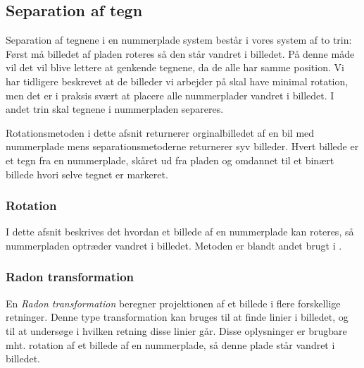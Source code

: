 \subsection{Separation af tegn}

Separation af tegnene i en nummerplade system består i vores system af to trin: Først må billedet af pladen roteres så den står vandret i billedet. På denne måde vil det vil blive lettere at genkende tegnene, da de alle har samme position. Vi har tidligere beskrevet at de billeder vi arbejder på skal have minimal rotation, men det er i praksis svært at placere alle nummerplader vandret i billedet. I andet trin skal tegnene i nummerpladen separeres.


Rotationsmetoden i dette afsnit returnerer orginalbilledet af en bil med nummerplade mens separationsmetoderne returnerer syv billeder. Hvert billede er et tegn fra en nummerplade, skåret ud fra pladen og omdannet til et binært billede hvori selve tegnet er markeret.


\subsubsection{Rotation}

I dette afsnit beskrives det hvordan et billede af en nummerplade kan roteres, så nummerpladen optræder vandret i billedet. Metoden er blandt andet brugt i \cite{shapiro}.

\subsubsection*{Radon transformation}

En \textit{Radon transformation} beregner projektionen af et billede i flere forskellige retninger\cite{matlab_radon}. Denne type transformation kan bruges til at finde linier i billedet, og til at undersøge i hvilken retning disse linier går. Disse oplysninger er brugbare mht. rotation af et billede af en nummerplade, så denne plade står vandret i billedet.


